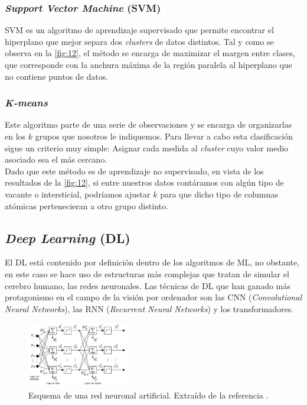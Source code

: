 \subsubsection{\textit{Support Vector Machine} (SVM)}
SVM es un algoritmo de aprendizaje supervisado que permite encontrar el hiperplano que mejor separa dos \textit{clusters} de datos distintos. Tal y como se observa en la \autoref{fig:12}, el método se encarga de maximizar el margen entre clases, que corresponde con la anchura máxima de la región paralela al hiperplano que no contiene puntos de datos.

\subsubsection{\textit{K-means}}
Este algoritmo parte de una serie de observaciones y se encarga de organizarlas en los $k$ grupos que nosotros le indiquemos. Para llevar a cabo esta clasificación sigue un criterio muy simple: Asignar cada medida al \textit{cluster} cuyo valor medio asociado sea el más cercano.\\

Dado que este método es de aprendizaje no supervisado, en vista de los resultados de la \autoref{fig:12}, si entre nuestros datos contáramos con algún tipo de vacante o intersticial, podríamos ajustar $k$ para que dicho tipo de columnas atómicas pertenecieran a otro grupo distinto.

\subsection{\textit{Deep Learning} (DL)}
El DL está contenido por definición dentro de los algoritmos de ML, no obstante, en este caso se hace uso de estructuras más complejas que tratan de simular el cerebro humano, las redes neuronales. Las técnicas de DL que han ganado más protagonismo en el campo de la visión por ordenador son las CNN (\textit{Convolutional Neural Networks}), las RNN (\textit{Recurrent Neural Networks}) y los transformadores.\\

\begin{figure}
    \includegraphics[width=0.40\textwidth]{fig/Fig13.png}
    \caption{Esquema de una red neuronal artificial. Extraído de la referencia \cite{red}.}
    \label{fig:13}
\end{figure} 


